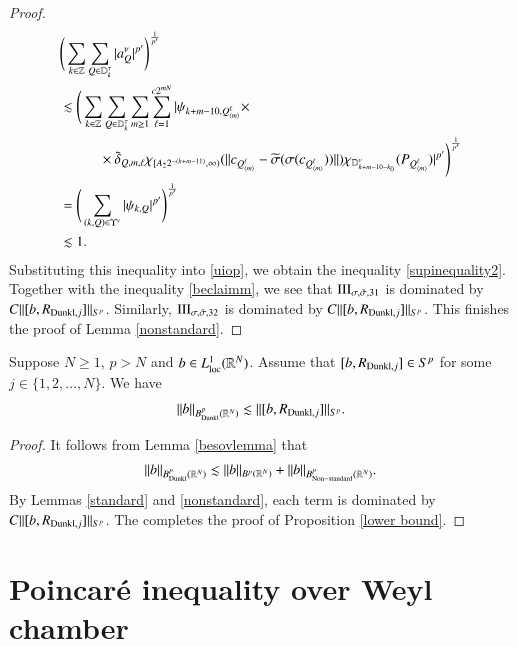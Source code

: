 \documentclass[12pt]{amsart}
\begin{document}
\begin{proof}
\begin{align*}
  &\Bigg(\sum_{k\in\mathbb{Z}}\sum_{Q\in\mathbb{D}_k^\tau}|a_Q^\nu|^{p'}\Bigg)^{\frac{1}{p'}}\nonumber\\
  &\lesssim \Bigg(\sum_{k\in\mathbb{Z}}\sum_{Q\in\mathbb{D}_k^\tau}
\sum_{m\geq 1}\sum_{\ell=1}^{c2^{mN}}|\psi_{k+m-10,Q_{\langle m \rangle}^\ell}\times\nonumber\\
&\hspace{1.0cm}\times \tilde{\delta}_{Q,m,\ell}\chi_{[A_22^{-(k+m-11)},\infty)}(\|c_{Q_{\langle m\rangle}^\ell}-\widetilde{\sigma}(\sigma(c_{Q_{\langle m\rangle}^\ell}))\|)\chi_{\mathbb{D}_{k+m-10-k_0}^\nu}(P_{Q_{\langle m\rangle}^\ell})|^{p'}\Bigg)^{\frac{1}{p'}}\nonumber\\
  &=\Bigg(\sum_{(k,Q)\in\Upsilon^\nu}|\psi_{k,Q}|^{p'}\Bigg)^{\frac{1}{p'}}\nonumber\\
  &\lesssim 1.
\end{align*}
Substituting this inequality into \eqref{uiop}, we obtain the inequality \eqref{supinequality2}. Together with the inequality \eqref{beclaimm}, we see that ${\rm III}_{\sigma,\tilde{\sigma},31}$ is dominated by $C\|[b,R_{{\rm Dunkl},j}]\|_{S^p}$. Similarly, ${\rm III}_{\sigma,\tilde{\sigma},32}$ is dominated by $C\|[b,R_{{\rm Dunkl},j}]\|_{S^p}$. This finishes the proof of Lemma \ref{nonstandard}.
\end{proof}

\begin{proposition}\label{lower bound}
Suppose $N\geq 1$, $p>N$ and $b\in  L^1_{{\rm loc}}(\mathbb R^{N})$.  Assume that $[b,R_{{\rm Dunkl},j}]\in S^{p}$ for some $j\in \{1,2,\ldots,N\}$. We have
    $$\|b\|_{B^p_{{\rm Dunkl}}(\mathbb{R}^N)}\lesssim\|[b,R_{{\rm Dunkl},j}]\|_{S^{p}}.$$
\end{proposition}
\begin{proof}
It follows from Lemma \ref{besovlemma} that
\begin{align}
  \|b\|_{B^{p}_{{\rm Dunkl}}(\mathbb{R}^N)}\lesssim \|b\|_{B^p(\mathbb{R}^N)}+\|b\|_{B^{p}_{{\rm Non}-{\rm standard}}(\mathbb{R}^N)}.
  \end{align}
By Lemmas \ref{standard} and \ref{nonstandard}, each term is dominated by $C\|[b,R_{{\rm Dunkl},j}]\|_{S^{p}}$. The completes the proof of Proposition \ref{lower bound}.
\end{proof}

\section{Poincar\'e inequality over Weyl chamber}
\setcounter{equation}{0}
\end{document}
